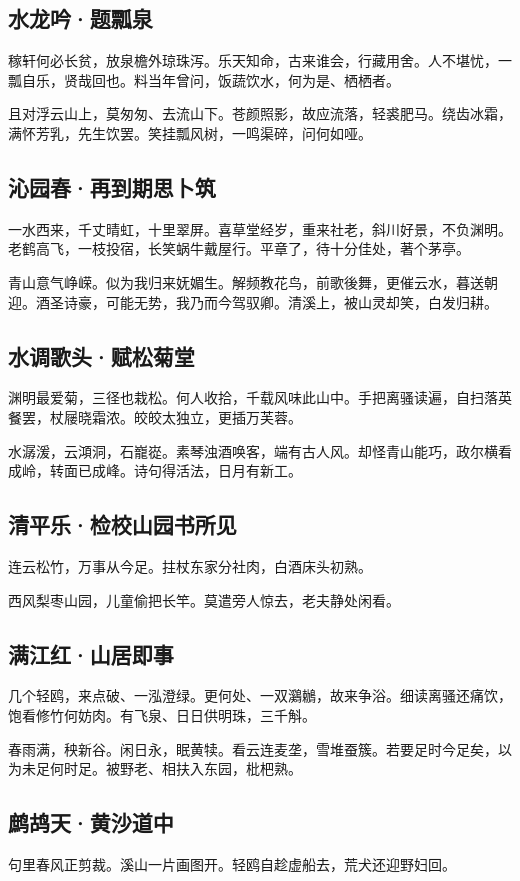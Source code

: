 \documentclass[a5paper]{ctexart}
\begin{document}
	\subsection{水龙吟·题瓢泉}
	稼轩何必长贫，放泉檐外琼珠泻。乐天知命，古来谁会，行藏用舍。人不堪忧，一瓢自乐，贤哉回也。料当年曾问，饭蔬饮水，何为是、栖栖者。
	
	且对浮云山上，莫匆匆、去流山下。苍颜照影，故应流落，轻裘肥马。绕齿冰霜，满怀芳乳，先生饮罢。笑挂瓢风树，一鸣渠碎，问何如哑。
	
	\subsection{沁园春·再到期思卜筑}
	一水西来，千丈晴虹，十里翠屏。喜草堂经岁，重来社老，斜川好景，不负渊明。老鹤高飞，一枝投宿，长笑蜗牛戴屋行。平章了，待十分佳处，著个茅亭。
	
	青山意气峥嵘。似为我归来妩媚生。解频教花鸟，前歌後舞，更催云水，暮送朝迎。酒圣诗豪，可能无势，我乃而今驾驭卿。清溪上，被山灵却笑，白发归耕。
	
	\subsection{水调歌头·赋松菊堂}
	渊明最爱菊，三径也栽松。何人收拾，千载风味此山中。手把离骚读遍，自扫落英餐罢，杖屦晓霜浓。皎皎太独立，更插万芙蓉。
	
	水潺湲，云澒洞，石巃嵸。素琴浊酒唤客，端有古人风。却怪青山能巧，政尔横看成岭，转面已成峰。诗句得活法，日月有新工。
	
	\subsection{清平乐·检校山园书所见}
	连云松竹，万事从今足。拄杖东家分社肉，白酒床头初熟。
	
	西风梨枣山园，儿童偷把长竿。莫遣旁人惊去，老夫静处闲看。
	
	\subsection{满江红·山居即事}
	几个轻鸥，来点破、一泓澄绿。更何处、一双鸂鶒，故来争浴。细读离骚还痛饮，饱看修竹何妨肉。有飞泉、日日供明珠，三千斛。
	
	春雨满，秧新谷。闲日永，眠黄犊。看云连麦垄，雪堆蚕簇。若要足时今足矣，以为未足何时足。被野老、相扶入东园，枇杷熟。
	
	\subsection{鹧鸪天·黄沙道中}
	句里春风正剪裁。溪山一片画图开。轻鸥自趁虚船去，荒犬还迎野妇回。
	
\end{document}
